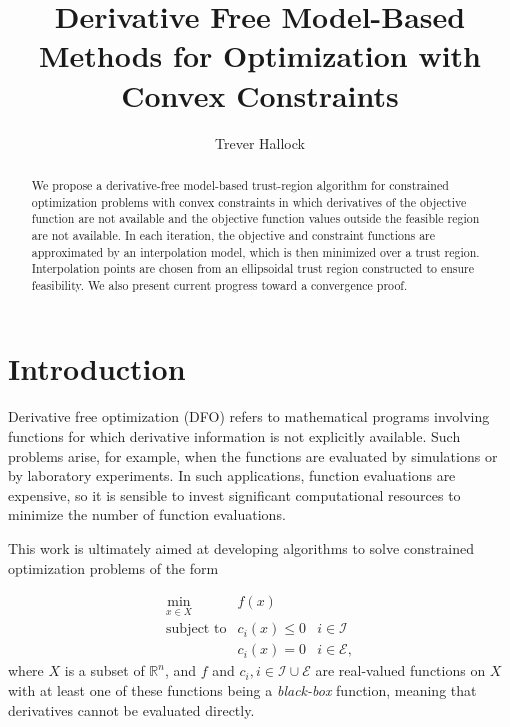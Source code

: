 \documentclass{article}
\title{Derivative Free Model-Based Methods for Optimization with Convex Constraints}
\author{Trever Hallock}
\theoremstyle{case}
\newcommand{\domain}{X}
\newcommand{\real}{\mathbb R}
\begin{document}
\maketitle

\begin{abstract}

We propose a derivative-free model-based trust-region algorithm for constrained optimization problems with convex constraints in which derivatives of the objective function are not available and the objective function values outside the feasible region are not available.
In each iteration, the objective and constraint functions are approximated by an interpolation model, which is then minimized over a trust region.
Interpolation points are chosen from an ellipsoidal trust region constructed to ensure feasibility.
We also present current progress toward a convergence proof.

\end{abstract}

\newpage

\tableofcontents

\newpage


\section{Introduction}

Derivative free optimization (DFO) refers to mathematical programs involving functions for which derivative information is not explicitly available.
Such problems arise, for example, when the functions are evaluated by simulations or by laboratory experiments.
In such applications, function evaluations are expensive, so it is sensible to invest significant computational resources to minimize the number of function evaluations.

This work is ultimately aimed at developing algorithms to solve constrained optimization problems of the form 

\[ \begin{array}{ccl} \min_{x \in \domain} & f(x) \\
\mbox{subject to} & c_i(x) \le 0 & i \in \mathcal{I} \\
& c_i(x) = 0 & i \in \mathcal{E},
\end{array}
\]
where $\domain$ is a subset of $\real^n$, and $f$ and $c_i, i \in \mathcal{I} \cup \mathcal{E}$ are real-valued functions on $X$ with at least one of these functions being a {\em black-box} function, meaning that derivatives cannot be evaluated directly.
\end{document}
